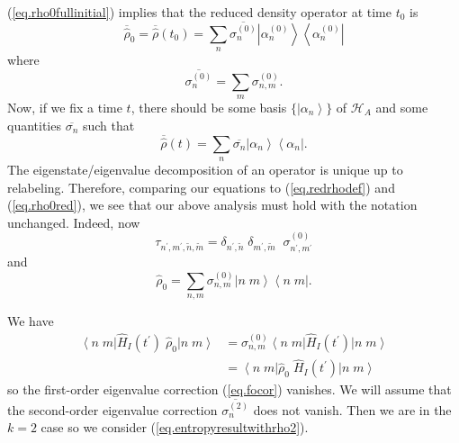 \documentclass[11pt]{article}
\newcommand{\bra}[1]{\left\langle#1\right|}
\newcommand{\ket}[1]{\left|#1\right\rangle}
\newcommand{\hilb}{\mathcal{H}}
\newcommand{\op}[1]{\hat{#1}}
\newcommand{\bket}[2]{\ket{#1\;#2}}
\newcommand{\bbra}[2]{\bra{#1\;#2}}
\theoremstyle{theorem}
\theoremstyle{remark}
\theoremstyle{step}
\theoremstyle{gap}
\begin{document}
(\ref{eq.rho0fullinitial}) implies that the reduced density operator at time \(t_0\) is
\[
\overline{\op{\rho}}_0 = \overline{\op{\rho}}\left(t_0\right) = \sum_n \overline{\sigma_{n}^{(0)}} \ket{\alpha_n^{(0)}}\bra{\alpha_n^{(0)}}
\]
where
\[
\overline{\sigma_n^{(0)}} = \sum_m \sigma_{n,m}^{(0)}.
\]
Now, if we fix a time \(t\), there should be some basis \(\{\ket{\alpha_n}\}\) of \(\hilb_A\) and some quantities \(\overline{\sigma_n}\) such that
\[
\overline{\op{\rho}}(t) = \sum_n \overline{\sigma_n} \ket{\alpha_n}\bra{\alpha_n}.
\]
The eigenstate/eigenvalue decomposition of an operator is unique up to relabeling. Therefore, comparing our equations to (\ref{eq.redrhodef}) and (\ref{eq.rho0red}), we see that our above analysis must hold with the notation unchanged. Indeed, now
\[\tau_{n^\prime, m^\prime, \tilde{n}, \tilde{m}} = \delta_{n^\prime, \tilde{n}}\;\delta_{m^\prime,\tilde{m}}\;\;\sigma_{n^\prime,m^\prime}^{(0)}\]
and
\begin{equation}
\label{eq.rho0full}
\op{\rho}_0 = \sum_{n,m} \sigma_{n,m}^{(0)} \bket{n}{m}\bbra{n}{m}.
\end{equation}

We have
\begin{align*}
\bbra{n}{m} \op{H}_I(t^\prime) \;\op{\rho}_0 \bket{n}{m} 
&= 
\sigma_{n,m}^{(0)} \bbra{n}{m} \op{H}_I(t^\prime) \bket{n}{m} 
\\&=
 \bbra{n}{m} \op{\rho}_0 \;\op{H}_I(t^\prime) \bket{n}{m} 
\end{align*}
so the first-order eigenvalue correction (\ref{eq.focor}) vanishes. We will assume that the second-order eigenvalue correction \(\overline{\sigma_n^{(2)}}\) does not vanish. Then we are in the \(k=2\) case so we consider (\ref{eq.entropyresultwithrho2}).
\end{document}
